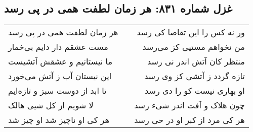 \begin{center}
\section*{غزل شماره ۸۳۱: هر زمان لطفت همی در پی رسد}
\label{sec:0831}
\begin{longtable}{l p{0.5cm} r}
هر زمان لطفت همی در پی رسد
&&
ور نه کس را این تقاضا کی رسد
\\
مست عشقم دار دایم بی‌خمار
&&
من نخواهم مستیی کز می‌رسد
\\
ما نیستانیم و عشقش آتشیست
&&
منتظر کان آتش اندر نی رسد
\\
این نیستان آب ز آتش می‌خورد
&&
تازه گردد ز آتشی کز وی رسد
\\
تا ابد از دوست سبز و تازه‌ایم
&&
او بهاری نیست کو را دی رسد
\\
لا شویم از کل شیی هالک
&&
چون هلاک و آفت اندر شیء رسد
\\
هر کی او ناچیز شد او چیز شد
&&
هر کی مرد از کبر او در حی رسد
\\
\end{longtable}
\end{center}
